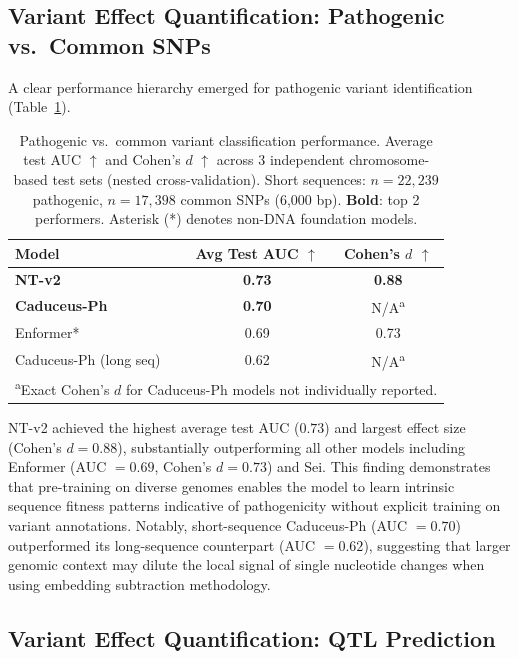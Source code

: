 \documentclass[11pt]{article}
\begin{document}
\subsection{Variant Effect Quantification: Pathogenic vs.\ Common SNPs}

A clear performance hierarchy emerged for pathogenic variant identification (Table~\ref{tab:pathogenic}).

\begin{table}[htbp]
\centering
\caption{Pathogenic vs.\ common variant classification performance. Average test AUC $\uparrow$ and Cohen's $d$ $\uparrow$ across 3 independent chromosome-based test sets (nested cross-validation). Short sequences: $n = 22{,}239$ pathogenic, $n = 17{,}398$ common SNPs (6,000 bp). \textbf{Bold}: top 2 performers. Asterisk (*) denotes non-DNA foundation models.}
\label{tab:pathogenic}
\begin{tabular}{lcc}
\toprule
\textbf{Model} & \textbf{Avg Test AUC $\uparrow$} & \textbf{Cohen's $d$ $\uparrow$} \\
\midrule
\textbf{NT-v2} & \textbf{0.73} & \textbf{0.88} \\
\textbf{Caduceus-Ph} & \textbf{0.70} & N/A\textsuperscript{a} \\
Enformer* & 0.69 & 0.73 \\
Caduceus-Ph (long seq) & 0.62 & N/A\textsuperscript{a} \\
\bottomrule
\multicolumn{3}{l}{\footnotesize \textsuperscript{a}Exact Cohen's $d$ for Caduceus-Ph models not individually reported.} \\
\end{tabular}
\end{table}

NT-v2 achieved the highest average test AUC ($0.73$) and largest effect size (Cohen's $d = 0.88$), substantially outperforming all other models including Enformer (AUC $= 0.69$, Cohen's $d = 0.73$) and Sei. This finding demonstrates that pre-training on diverse genomes enables the model to learn intrinsic sequence fitness patterns indicative of pathogenicity without explicit training on variant annotations. Notably, short-sequence Caduceus-Ph (AUC $= 0.70$) outperformed its long-sequence counterpart (AUC $= 0.62$), suggesting that larger genomic context may dilute the local signal of single nucleotide changes when using embedding subtraction methodology.

\subsection{Variant Effect Quantification: QTL Prediction}
\end{document}
